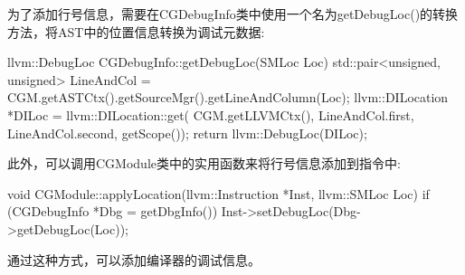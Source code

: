 为了添加行号信息，需要在CGDebugInfo类中使用一个名为getDebugLoc()的转换方法，将AST中的位置信息转换为调试元数据:

\begin{cpp}
llvm::DebugLoc CGDebugInfo::getDebugLoc(SMLoc Loc) {
    std::pair<unsigned, unsigned> LineAndCol =
        CGM.getASTCtx().getSourceMgr().getLineAndColumn(Loc);
    llvm::DILocation *DILoc = llvm::DILocation::get(
        CGM.getLLVMCtx(), LineAndCol.first, LineAndCol.second,
        getScope());
    return llvm::DebugLoc(DILoc);
}
\end{cpp}

此外，可以调用CGModule类中的实用函数来将行号信息添加到指令中:

\begin{cpp}
void CGModule::applyLocation(llvm::Instruction *Inst,
                             llvm::SMLoc Loc) {
    if (CGDebugInfo *Dbg = getDbgInfo())
        Inst->setDebugLoc(Dbg->getDebugLoc(Loc));
}
\end{cpp}

通过这种方式，可以添加编译器的调试信息。





































